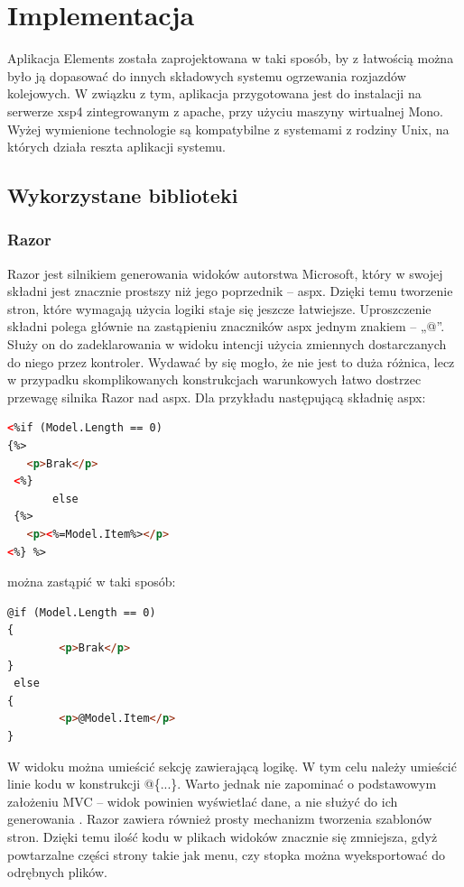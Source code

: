 \chapter{Implementacja}

Aplikacja Elements została zaprojektowana w taki sposób, by z łatwością można było ją dopasować do innych składowych systemu ogrzewania rozjazdów kolejowych. W związku z tym, aplikacja przygotowana jest do instalacji na serwerze xsp4 zintegrowanym z apache, przy użyciu maszyny wirtualnej Mono. Wyżej wymienione technologie są kompatybilne z systemami z rodziny Unix, na których działa reszta aplikacji systemu.

\section{Wykorzystane biblioteki}

\subsection{Razor}

Razor jest silnikiem generowania widoków autorstwa Microsoft, który w swojej składni jest znacznie prostszy niż jego poprzednik – aspx. Dzięki temu tworzenie stron, które wymagają użycia logiki staje się jeszcze łatwiejsze. Uproszczenie składni polega głównie na zastąpieniu znaczników aspx jednym znakiem -- „@”. Służy on do zadeklarowania w widoku intencji użycia zmiennych dostarczanych do niego przez kontroler. Wydawać by się mogło, że nie jest to duża różnica, lecz w przypadku skomplikowanych konstrukcjach warunkowych łatwo dostrzec przewagę silnika Razor nad aspx. Dla przykładu następującą składnię aspx:

\begin{lstlisting}[language=HTML]
<%if (Model.Length == 0)
{%>
   <p>Brak</p>
 <%}
       else
 {%>
   <p><%=Model.Item%></p>
<%} %>
\end{lstlisting}
można zastąpić w taki sposób:
\begin{lstlisting}[language=HTML]
@if (Model.Length == 0)
{
        <p>Brak</p>
}
 else
{
        <p>@Model.Item</p>
}
\end{lstlisting}
W widoku można umieścić sekcję zawierającą logikę. W tym celu należy umieścić linie kodu w konstrukcji @\{...\}. Warto jednak nie zapominać o podstawowym założeniu MVC – widok powinien wyświetlać dane, a nie służyć do ich generowania \cite{design-patterns}.
Razor zawiera również prosty mechanizm tworzenia szablonów stron. Dzięki temu ilość kodu w plikach widoków znacznie się zmniejsza, gdyż powtarzalne części strony takie jak menu, czy stopka można wyeksportować do odrębnych plików.

